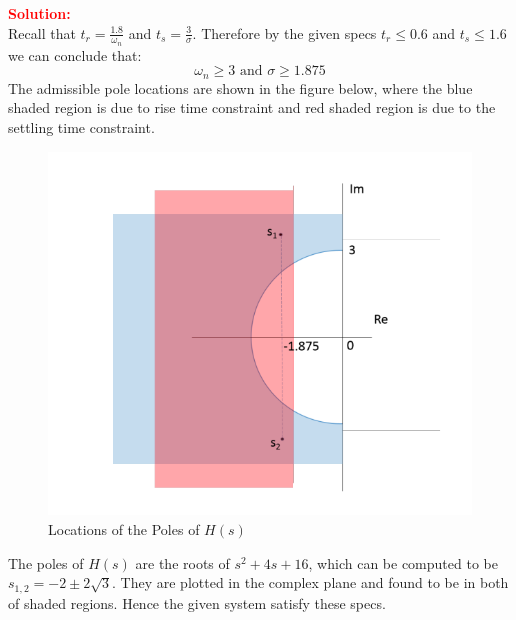 \documentclass[12pt]{article}
\begin{document}
\noindent \textbf{\textcolor{red}{Solution:}} \\
Recall that $t_r=\frac{1.8}{\omega_n}$ and $t_s=\frac{3}{\sigma}$.
Therefore by the given specs $t_r \leq 0.6$ and $t_s \leq 1.6$  we can conclude that:
\[
\omega_n \geq 3 \text{  and  } \sigma \geq 1.875
\]
The admissible pole locations are shown in the figure below, where the blue shaded region is due to rise time constraint and red shaded region is due to the settling time constraint.

\begin{figure}[h!]
    \centering
    \includegraphics[width=0.65\linewidth]{figs/1.25.png}
        \caption{Locations of the Poles of \(H(s)\)}
    \label{fig:prb42}
\end{figure}
\noindent The poles of $H(s)$ are the roots of $s^2 + 4s + 16$, which can be computed to be $s_{1,2} = -2 \pm 2 \sqrt{3}$. They are plotted in the complex plane and found to be in both of shaded regions. Hence the given system satisfy these specs.

\clearpage
\end{document}

